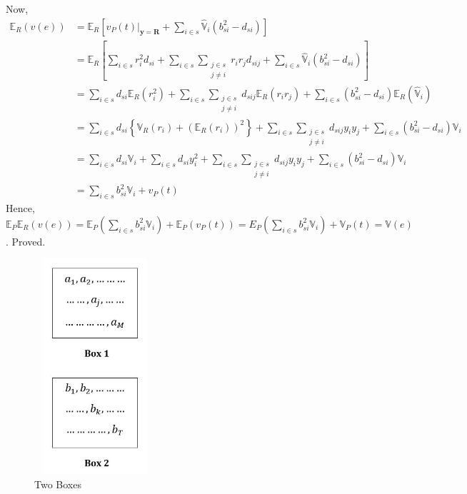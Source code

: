 \documentclass[12pt]{article}
\newcommand{\E}{\mathbb{E}}
\newcommand{\Var}{\mathbb{V}}
\theoremstyle{definition}
\begin{document}
Now,
\begin{align*}
    \E_R(v(e)) & = \E_R\left[\left.v_P(t)\right|_{\mathbf{y}=\mathbf{R}}+\sum_{i\in s} \hat{\Var}_i (b_{si}^2-d_{si})\right]\\
    & = \E_R\left[\sum_{i\in s} r_i^2d_{si} +\displaystyle \sum_{i\in s} \sum_{\substack{j\in s \\ j\neq i}} r_ir_jd_{sij}+\sum_{i\in s} \hat{\Var}_i (b_{si}^2-d_{si})\right]\\
    & = \sum_{i\in s} d_{si}\E_R(r_i^2) +\displaystyle \sum_{i\in s} \sum_{\substack{j\in s \\ j\neq i}} d_{sij}\E_R(r_ir_j)+\sum_{i\in s}  (b_{si}^2-d_{si})\E_R\left(\hat{\Var}_i\right)\\
    & = \sum_{i\in s} d_{si}\left\{\Var_R(r_i)+(\E_R(r_i))^2\right\}+ \displaystyle \sum_{i\in s} \sum_{\substack{j\in s \\ j\neq i}} d_{sij}y_iy_j + \sum_{i\in s}  (b_{si}^2-d_{si})\Var_i  \\
    & = \sum_{i\in s} d_{si}\Var_i + \sum_{i\in s} d_{si}y_i^2 + \displaystyle \sum_{i\in s} \sum_{\substack{j\in s \\ j\neq i}} d_{sij}y_iy_j + \sum_{i\in s}  (b_{si}^2-d_{si})\Var_i \\
    & = \sum_{i\in s} b_{si}^2 \Var_i + v_P(t)
\end{align*}
Hence, $\E_P\E_R(v(e))=\E_P\left(\displaystyle\sum_{i\in s} b_{si}^2 \Var_i\right)+\E_P(v_P(t))=E_P\left(\displaystyle\sum_{i\in s} b_{si}^2 \Var_i\right)+\Var_P(t)=\Var(e)$. 
Proved.


\begin{figure}\label{SS2}
\centering
\includegraphics[width=4.5cm, height= 8cm]{SS figures/SS2.JPG}
\caption{Two Boxes}\label{SS2}
\end{figure}
\end{document}
